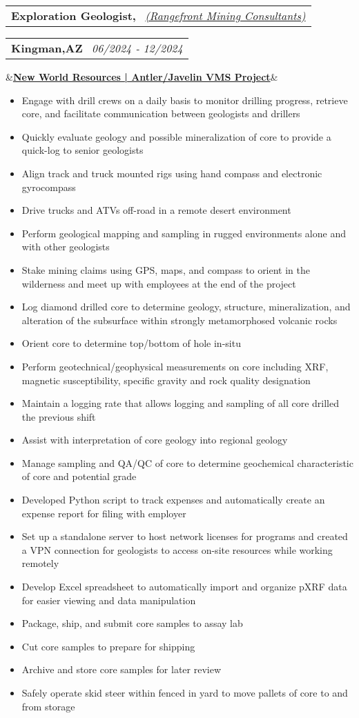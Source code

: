 \documentclass[12pt,a4paper,sans]{moderncv}
\makeatletter
\newcommand*{\customcventry}[7][.13em]{
\begin{tabular}{@{}l}
{\bfseries #4} \
{\itshape #3}
\end{tabular}
\hfill
\begin{tabular}{l@{}}
{\bfseries #5} \
{\itshape #2}
\end{tabular}
\ifx&#7&%
\else{\
\begin{minipage}{\maincolumnwidth}%
\small#7%
\end{minipage}}\fi%
\par\addvspace{#1}}
\makeatother
\begin{document}
\customcventry{06/2024 ‐ 12/2024}{{\color{blue}\href{https://www.rangefront.com/}{(Rangefront Mining Consultants)}}}{Exploration Geologist,}{Kingman,AZ}{}{\color{blue}\href{https://newworldres.com/projects/antler-copper-project-arizona-usa/}{\textbf{New World Resources | Antler/Javelin VMS Project}}}
\vspace{-1mm}
{\begin{itemize}[noitemsep, leftmargin=0.6cm, label={\textbullet}]
\item Engage with drill crews on a daily basis to monitor drilling progress, retrieve core, and facilitate communication between geologists and drillers
\item Quickly evaluate geology and possible mineralization of core to provide a quick-log to senior geologists
\item Align track and truck mounted rigs using hand compass and electronic gyrocompass
\item Drive trucks and ATVs off-road in a remote desert environment
\item Perform geological mapping and sampling in rugged environments alone and with other geologists
\item Stake mining claims using GPS, maps, and compass to orient in the wilderness and meet up with employees at the end of the project
\item Log diamond drilled core to determine geology, structure, mineralization, and alteration of the subsurface within strongly metamorphosed volcanic rocks
\item Orient core to determine top/bottom of hole in-situ
\item Perform geotechnical/geophysical measurements on core including XRF, magnetic susceptibility, specific gravity and rock quality designation
\item Maintain a logging rate that allows logging and sampling of all core drilled the previous shift
\item Assist with interpretation of core geology into regional geology
\item Manage sampling and QA/QC of core to determine geochemical characteristic of core and potential grade
\item Developed Python script to track expenses and automatically create an expense report for filing with employer
\item Set up a standalone server to host network licenses for programs and created a VPN connection for geologists to access on-site resources while working remotely
\item Develop Excel spreadsheet to automatically import and organize pXRF data for easier viewing and data manipulation
\item Package, ship, and submit core samples to assay lab
\item Cut core samples to prepare for shipping
\item Archive and store core samples for later review
\item Safely operate skid steer within fenced in yard to move pallets of core to and from storage


\end{itemize}}
\end{document}
